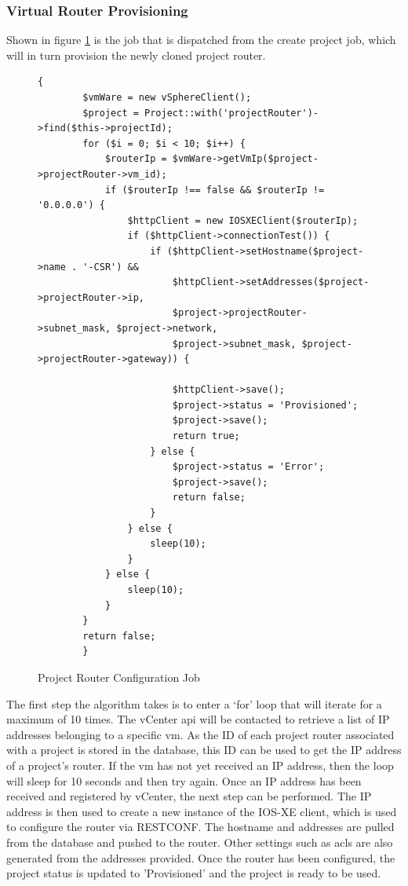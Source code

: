 \subsubsection{Virtual Router Provisioning}
Shown in figure \ref{fig:project-router-configuration-job} is the job that is dispatched from the create project job, which will in turn provision the newly cloned project router.
\begin{figure}[H]
    \begin{lstlisting}[basicstyle=\scriptsize]
        {
        $vmWare = new vSphereClient();
        $project = Project::with('projectRouter')->find($this->projectId);
        for ($i = 0; $i < 10; $i++) {
            $routerIp = $vmWare->getVmIp($project->projectRouter->vm_id);
            if ($routerIp !== false && $routerIp != '0.0.0.0') {
                $httpClient = new IOSXEClient($routerIp);
                if ($httpClient->connectionTest()) {
                    if ($httpClient->setHostname($project->name . '-CSR') &&
                        $httpClient->setAddresses($project->projectRouter->ip,
                        $project->projectRouter->subnet_mask, $project->network,
                        $project->subnet_mask, $project->projectRouter->gateway)) {

                        $httpClient->save();
                        $project->status = 'Provisioned';
                        $project->save();
                        return true;
                    } else {
                        $project->status = 'Error';
                        $project->save();
                        return false;
                    }
                } else {
                    sleep(10);
                }
            } else {
                sleep(10);
            }
        }
        return false;
        }
    \end{lstlisting}
    \caption{Project Router Configuration Job}
    \label{fig:project-router-configuration-job}
\end{figure}

The first step the algorithm takes is to enter a `for' loop that will iterate for a maximum of 10 times. The vCenter \gls{api} will be contacted to retrieve a list of IP addresses belonging to a specific \gls{vm}. As the ID of each project router associated with a project is stored in the database, this ID can be used to get the IP address of a project's router. If the \gls{vm} has not yet received an IP address, then the loop will sleep for 10 seconds and then try again. Once an IP address has been received and registered by vCenter, the next step can be performed. The IP address is then used to create a new instance of the IOS-XE client, which is used to configure the router via RESTCONF. The hostname and addresses are pulled from the database and pushed to the router. Other settings such as \gls{acl}s are also generated from the addresses provided. Once the router has been configured, the project status is updated to 'Provisioned' and the project is ready to be used.

